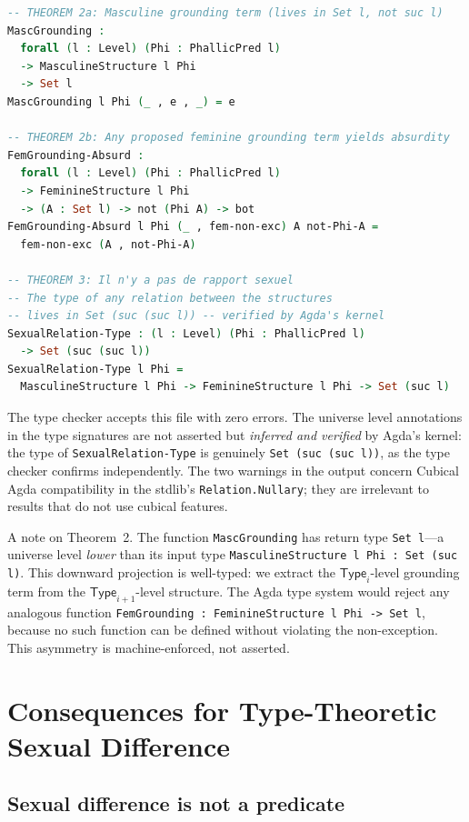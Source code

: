 \documentclass[12pt]{article}
\theoremstyle{definition}
\theoremstyle{remark}
\newcommand{\Type}[1]{\mathsf{Type}_{#1}}
\begin{document}
\begin{lstlisting}[language=Agda, caption={Complete Agda formalization of the sexuation theorems}]
-- THEOREM 2a: Masculine grounding term (lives in Set l, not suc l)
MascGrounding :
  forall (l : Level) (Phi : PhallicPred l)
  -> MasculineStructure l Phi
  -> Set l
MascGrounding l Phi (_ , e , _) = e

-- THEOREM 2b: Any proposed feminine grounding term yields absurdity
FemGrounding-Absurd :
  forall (l : Level) (Phi : PhallicPred l)
  -> FeminineStructure l Phi
  -> (A : Set l) -> not (Phi A) -> bot
FemGrounding-Absurd l Phi (_ , fem-non-exc) A not-Phi-A =
  fem-non-exc (A , not-Phi-A)

-- THEOREM 3: Il n'y a pas de rapport sexuel
-- The type of any relation between the structures
-- lives in Set (suc (suc l)) -- verified by Agda's kernel
SexualRelation-Type : (l : Level) (Phi : PhallicPred l)
  -> Set (suc (suc l))
SexualRelation-Type l Phi =
  MasculineStructure l Phi -> FeminineStructure l Phi -> Set (suc l)
\end{lstlisting}

The type checker accepts this file with zero errors. The universe level annotations in the type signatures are not asserted but \emph{inferred and verified} by Agda's kernel: the type of \texttt{SexualRelation-Type} is genuinely \texttt{Set (suc (suc l))}, as the type checker confirms independently. The two warnings in the output concern Cubical Agda compatibility in the stdlib's \texttt{Relation.Nullary}; they are irrelevant to results that do not use cubical features.

A note on Theorem~2. The function \texttt{MascGrounding} has return type \texttt{Set l}---a universe level \emph{lower} than its input type \texttt{MasculineStructure l Phi : Set (suc l)}. This downward projection is well-typed: we extract the $\Type{i}$-level grounding term from the $\Type{i+1}$-level structure. The Agda type system would reject any analogous function \texttt{FemGrounding : FeminineStructure l Phi -> Set l}, because no such function can be defined without violating the non-exception. This asymmetry is machine-enforced, not asserted.

\section{Consequences for Type-Theoretic Sexual Difference}

\subsection{Sexual difference is not a predicate}
\end{document}
